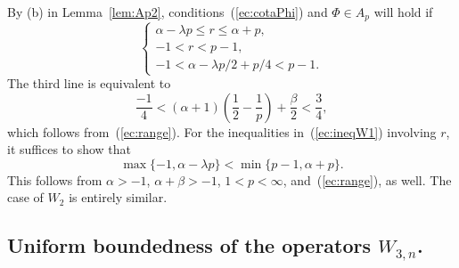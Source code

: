\documentclass[reqno]{amsart}
\theoremstyle{plain}
\theoremstyle{definition}
\theoremstyle{remark}
\begin{document}
By (b) in Lemma~\ref{lem:Ap2}, conditions~(\ref{ec:cotaPhi}) and $\Phi \in A_p$
will hold if
\begin{equation}
\label{ec:ineqW1}
   \begin{cases}
   \alpha - \lambda p \le r \le \alpha + p, \\
   -1 < r < p - 1, \\
   -1 < \alpha - \lambda p/2 + p/4 < p - 1.
   \end{cases}
\end{equation}
The third line is equivalent to
\begin{equation*}
    \frac{-1}4 < (\alpha+1) \left( \frac12 - \frac1p \right) + \frac\beta2
    < \frac34,
\end{equation*}
which follows from~(\ref{ec:range}).
For the inequalities in~(\ref{ec:ineqW1}) involving $r$, it suffices to show
that
\begin{equation*}
   \max\{-1, \alpha - \lambda p\} < \min\{p - 1, \alpha + p\}.
\end{equation*}
This follows from $\alpha > -1$, $\alpha+\beta > -1$, $1 < p < \infty$,
and~(\ref{ec:range}), as well. The case of $W_2$ is entirely similar.


\subsection{Uniform boundedness of the operators $W_{3,n}$.}
\end{document}
